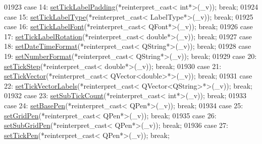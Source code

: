 \begin{DoxyCode}
01923         \textcolor{keywordflow}{case} 14: \hyperlink{a00025_af302c479af9dbc2e9f0e44e07c0012ee}{setTickLabelPadding}(*reinterpret\_cast< int*>(\_v)); \textcolor{keywordflow}{break};
01924         \textcolor{keywordflow}{case} 15: \hyperlink{a00025_a54f24f5ce8feea25209388a863d7e448}{setTickLabelType}(*reinterpret\_cast< LabelType*>(\_v)); \textcolor{keywordflow}{break};
01925         \textcolor{keywordflow}{case} 16: \hyperlink{a00025_a2b8690c4e8dbc39d9185d2b398ce7a6c}{setTickLabelFont}(*reinterpret\_cast< QFont*>(\_v)); \textcolor{keywordflow}{break};
01926         \textcolor{keywordflow}{case} 17: \hyperlink{a00025_a1bddd4413df8a576b7ad4b067fb33375}{setTickLabelRotation}(*reinterpret\_cast< double*>(\_v)); \textcolor{keywordflow}{break};
01927         \textcolor{keywordflow}{case} 18: \hyperlink{a00025_a2ee0191daa03524a682113e63e05f7a7}{setDateTimeFormat}(*reinterpret\_cast< QString*>(\_v)); \textcolor{keywordflow}{break};
01928         \textcolor{keywordflow}{case} 19: \hyperlink{a00025_ae585a54dc2aac662e90a2ca82f002590}{setNumberFormat}(*reinterpret\_cast< QString*>(\_v)); \textcolor{keywordflow}{break};
01929         \textcolor{keywordflow}{case} 20: \hyperlink{a00025_af727db0acc6492c4c774c0700e738205}{setTickStep}(*reinterpret\_cast< double*>(\_v)); \textcolor{keywordflow}{break};
01930         \textcolor{keywordflow}{case} 21: \hyperlink{a00025_a871db94c5d796c80fcbe1a9d4506e27e}{setTickVector}(*\textcolor{keyword}{reinterpret\_cast<} QVector<double>*\textcolor{keyword}{>}(\_v)); \textcolor{keywordflow}{break};
01931         \textcolor{keywordflow}{case} 22: \hyperlink{a00025_a921d3ba3853ca3bd2cce3459f7a243ed}{setTickVectorLabels}(*\textcolor{keyword}{reinterpret\_cast<} QVector<QString>*\textcolor{keyword}{>}(\_v)); \textcolor{keywordflow}{break};
01932         \textcolor{keywordflow}{case} 23: \hyperlink{a00025_a4b1554ead9d7f9799650d51383e326dd}{setSubTickCount}(*reinterpret\_cast< int*>(\_v)); \textcolor{keywordflow}{break};
01933         \textcolor{keywordflow}{case} 24: \hyperlink{a00025_a778d45fb71b3c7ab3bb7079e18b058e4}{setBasePen}(*reinterpret\_cast< QPen*>(\_v)); \textcolor{keywordflow}{break};
01934         \textcolor{keywordflow}{case} 25: \hyperlink{a00025_a70ca642125280be510dc3c2745560591}{setGridPen}(*reinterpret\_cast< QPen*>(\_v)); \textcolor{keywordflow}{break};
01935         \textcolor{keywordflow}{case} 26: \hyperlink{a00025_ad773fa7071b129ef6fa50431ce47816e}{setSubGridPen}(*reinterpret\_cast< QPen*>(\_v)); \textcolor{keywordflow}{break};
01936         \textcolor{keywordflow}{case} 27: \hyperlink{a00025_ad80923bcc1c5da4c4db602c5325e797e}{setTickPen}(*reinterpret\_cast< QPen*>(\_v)); \textcolor{keywordflow}{break};

\end{DoxyCode}
